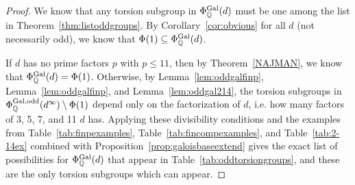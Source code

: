 \begin{proof}
We know that any torsion subgroup in $\Phi_{\mathbb{Q}}^{\operatorname{Gal}}(d)$ must be one among the list in Theorem~\ref{thm:listoddgroups}. By Corollary~\ref{cor:obvious} for all $d$ (not necessarily odd), we know that $\Phi(1) \subseteq \Phi_{\mathbb{Q}}^{\operatorname{Gal}}(d)$. 

If $d$ has no prime factors $p$ with $p \leq 11$, then by Theorem~\ref{NAJMAN}, we know that $\Phi_{\mathbb{Q}}^{\operatorname{Gal}}(d)= \Phi(1)$. Otherwise, by Lemma~\ref{lem:oddgalfinp}, Lemma~\ref{lem:oddgalfinp}, and Lemma~\ref{lem:oddgal214}, the torsion subgroups in $\Phi_{\mathbb{Q}}^{\operatorname{Gal},\text{odd}}(d^\infty) \setminus \Phi(1)$ depend only on the factorization of $d$, i.e. how many factors of 3, 5, 7, and 11 $d$ has. Applying these divisibility conditions and the examples from Table~\ref{tab:finpexamples}, Table~\ref{tab:fincompexamples}, and Table~\ref{tab:2-14ex} combined with Proposition~\ref{prop:galoisbaseextend} gives the exact list of possibilities for $\Phi_{\mathbb{Q}}^{\operatorname{Gal}}(d)$ that appear in Table~\ref{tab:oddtorsiongroups}, and these are the only torsion subgroups which can appear. 
\end{proof}


